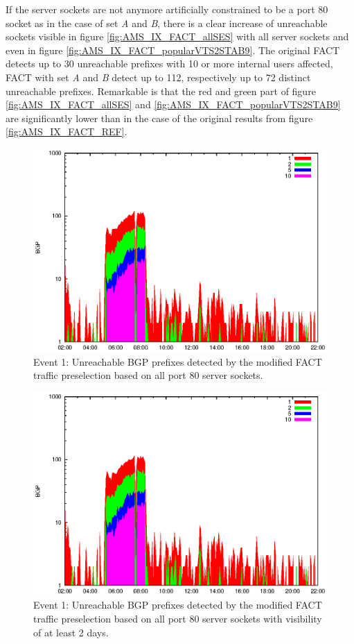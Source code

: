 If the server sockets are not anymore artificially constrained to be a port 80 socket as in the case of set \emph{A} and \emph{B}, there is a clear increase of unreachable sockets visible in figure \ref{fig:AMS_IX_FACT_allSES} with all server sockets and even in figure \ref{fig:AMS_IX_FACT_popularVTS2STAB9}. The original FACT detects up to 30 unreachable prefixes with 10 or more internal users affected, FACT with set \emph{A} and \emph{B} detect up to 112, respectively up to 72 distinct unreachable prefixes. Remarkable is that the red and green part of figure \ref{fig:AMS_IX_FACT_allSES} and \ref{fig:AMS_IX_FACT_popularVTS2STAB9} are significantly lower than in the case of the original results from figure \ref{fig:AMS_IX_FACT_REF}. 
\begin{figure}
	[p] \centering 
	\includegraphics[width=0.75\linewidth]{images/events/2010_03_25/bgp_log_allPort80SES.eps} \caption{Event 1: Unreachable BGP prefixes detected by the modified FACT traffic preselection based on all port 80 server sockets.} 
	\label{fig:AMS_IX_FACT_allSES80} 
\end{figure}
\begin{figure}
	[p] \centering 
	\includegraphics[width=0.75\linewidth]{images/events/2010_03_25/bgp_log_port80_Set_stab_0_vts_2.eps} \caption{Event 1: Unreachable BGP prefixes detected by the modified FACT traffic preselection based on all port 80 server sockets with visibility of at least 2 days.} 
	\label{fig:AMS_IX_FACT_allSES80VTS2} 
\end{figure}
